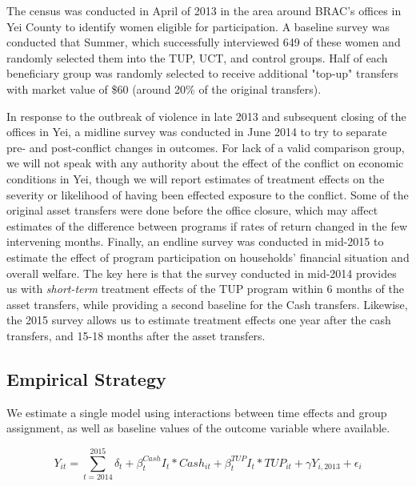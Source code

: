 \documentclass[12pt,article]{article}
\begin{document}
The census was conducted in April of 2013 in the area around BRAC's offices in Yei
County to identify women eligible for participation. A baseline survey was conducted
that Summer, which successfully interviewed 649 of these women and randomly selected
them into the TUP, UCT, and control groups. Half of each beneficiary group was
randomly selected to receive additional "top-up" transfers with market value of \$60
(around 20\% of the original transfers).

In response to the outbreak of violence in late 2013 and subsequent closing of the
offices in Yei, a midline survey was conducted in June 2014 to try to separate pre-
and post-conflict changes in outcomes. For lack of a valid comparison group, we will
not speak with any authority about the effect of the conflict on economic conditions
in Yei, though we will report estimates of treatment effects on the severity or
likelihood of having been effected exposure to the conflict. Some of the original
asset transfers were done before the office closure, which may affect estimates of
the difference between programs if rates of return changed in the few intervening
months. Finally, an endline survey was conducted in mid-2015 to estimate the effect
of program participation on households' financial situation and overall welfare. The
key here is that the survey conducted in mid-2014 provides us with \emph{short-term}
treatment effects of the TUP program within 6 months of the asset transfers, while
providing a second baseline for the Cash transfers. Likewise, the 2015 survey
allows us to estimate treatment effects one year after the cash transfers, and 15-18
months after the asset transfers.

\subsection{Empirical Strategy}
\label{sec-2-2}

We estimate a single model using interactions between time effects and group
assignment, as well as baseline values of the outcome variable where available. 

\begin{equation*}
Y_{it} =\sum_{t=2014}^{2015}\delta_{t}+\beta_{t}^{Cash}I_{t}*Cash_{it}+\beta_{t}^{TUP}I_{t}*TUP_{it}+\gamma Y_{i,2013}+\epsilon_{i}
\end{equation*}
\end{document}

